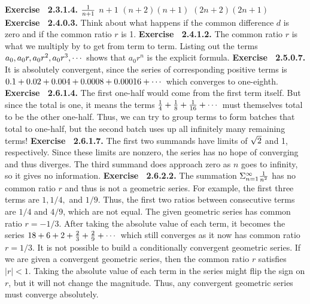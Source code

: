 \par 
 {\noindent \protect \bf  Exercise ~2.3.1.4.} \textbullet $\protect \frac  {1}{n+1}$ \textbullet $n+1$ \textbullet $(n+2)(n+1)$ \textbullet $(2n+2)(2n+1)$ \protect \newline  \protect \newline  
 {\noindent \protect \bf  Exercise ~2.4.0.3.} Think about what happens if the common difference $d$ is zero and if the common ratio $r$ is 1. \protect \newline  \protect \newline  
 {\noindent \protect \bf  Exercise ~2.4.1.2.} The common ratio $r$ is what we multiply by to get from term to term. Listing out the terms $a_0, a_0r, a_0r^2, a_0r^3,\protect \cdots  $ shows that $a_0r^n$ is the explicit formula. \protect \newline  \protect \newline  
 {\noindent \protect \bf  Exercise ~2.5.0.7.} It is absolutely convergent, since the series of corresponding positive terms is $0.1+0.02+0.004+0.0008+0.00016+\protect \cdots  $ which converges to one-eighth.  \protect \newline  \protect \newline  
 {\noindent \protect \bf  Exercise ~2.6.1.4.} The first one-half would come from the first term itself. But since the total is one, it means the terms $\protect \frac  {1}{4}+\protect \frac  {1}{8}+\protect \frac  {1}{16}+\protect \cdots  $ must themselves total to be the other one-half. Thus, we can try to group terms to form batches that total to one-half, but the second batch uses up all infinitely many remaining terms!  \protect \newline  \protect \newline  
 {\noindent \protect \bf  Exercise ~2.6.1.7.} The first two summands have limits of $\protect \sqrt  {2}$ and 1, respectively. Since these limits are nonzero, the series has no hope of converging and thus diverges. The third summand does approach zero as $n$ goes to infinity, so it gives no information. \protect \newline  \protect \newline  
 {\noindent \protect \bf  Exercise ~2.6.2.2.} \textbullet The summation $\Sigma _{n=1}^\infty \protect \frac  {1}{n^2}$ has no common ratio $r$ and thus is not a geometric series. For example, the first three terms are $1,1/4,$ and $1/9$. Thus, the first two ratios between consecutive terms are $1/4$ and $4/9$, which are not equal. \textbullet The given geometric series has common ratio $r=-1/3$. After taking the absolute value of each term, it becomes the series $18+6+2+\protect \frac  {2}{3}+\protect \frac  {2}{9}+\protect \cdots  $ which still converges as it now has common ratio $r=1/3$. \textbullet It is not possible to build a conditionally convergent geometric series. If we are given a convergent geometric series, then the common ratio $r$ satisfies $|r|<1$. Taking the absolute value of each term in the series might flip the sign on $r$, but it will not change the magnitude. Thus, any convergent geometric series must converge absolutely. \protect \newline  \protect \newline  
